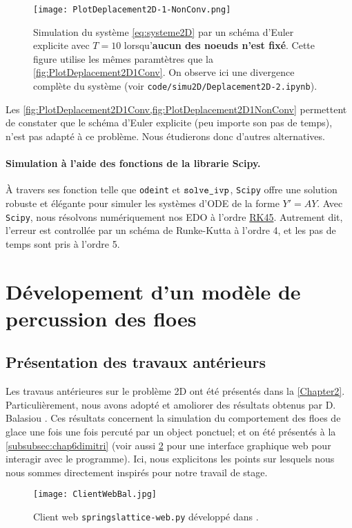 \begin{figure}[!h]
    \centering
    \texttt{[image: PlotDeplacement2D-1-NonConv.png]}
    \caption{Simulation du système \ref{eq:systeme2D} par un schéma d'Euler explicite avec $T = 10$ lorsqu'\textbf{aucun des noeuds n'est fixé}. Cette figure utilise les mêmes paramtètres que la \cref{fig:PlotDeplacement2D1Conv}. On observe ici une divergence complète du système (voir \texttt{code/simu2D/Deplacement2D-2.ipynb}).}
    \label{fig:PlotDeplacement2D1NonConv}
\end{figure}

Les \cref{fig:PlotDeplacement2D1Conv,fig:PlotDeplacement2D1NonConv} permettent de constater que le schéma d'Euler explicite (peu importe son pas de temps), n'est pas adapté à ce problème. Nous étudierons donc d'autres alternatives. 

 
\paragraph{Simulation à l'aide des fonctions de la librarie Scipy.} À travers ses fonction telle que \texttt{odeint} et $\verb|solve_ivp|$, \texttt{Scipy} offre une solution robuste et élégante pour simuler les systèmes d'ODE de la forme $Y' = AY$. Avec \texttt{Scipy}, nous résolvons numériquement nos EDO à l'ordre \href{https://docs.scipy.org/doc/scipy/reference/generated/scipy.integrate.solve_ivp.html}{RK45}. Autrement dit, l'erreur est controllée par un schéma de Runke-Kutta à l'ordre 4, et les pas de temps sont pris à l'ordre 5.







\section{Dévelopement d'un modèle de percussion des floes}




\subsection{Présentation des travaux antérieurs}




Les travaus antérieures sur le problème 2D ont été présentés dans la 
\cref{Chapter2}. Particulièrement, nous avons adopté et amoliorer des résultats obtenus par D. Balasiou \parencite{balasoiu2020halthesis}. Ces résultats concernent la simulation du comportement des floes de glace une fois une fois percuté par un object ponctuel; et on été présentés à la \cref{subsubsec:chap6dimitri} (voir aussi \cref{fig:clientwebbal} pour une interface graphique web pour interagir avec le programme). Ici, nous explicitons les points sur lesquels nous nous sommes directement inspirés pour notre travail de stage.
\begin{figure}[!h]
    \centering
    \texttt{[image: ClientWebBal.jpg]}
    \caption{Client web \texttt{springslattice-web.py} développé dans \parencite[p.197]{balasoiu2020halthesis}.}
    \label{fig:clientwebbal}
\end{figure}




